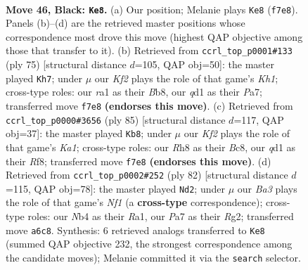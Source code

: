 \documentclass[11pt]{article}
\begin{document}
\clearpage

\begin{figure}[p]\centering
\begin{subfigure}{0.46\textwidth}\centering
\resizebox{\linewidth}{!}{%
\newchessgame
\chessboard[
  setfen={7r/p2r1k1p/bq1b2pP/1p1p1pP1/1n1P1P1K/1P2P3/4N3/R2Q1BNR b - - 39 46},
  showmover=false,
  pgfstyle=straightmove, color=movearrow, markmove={f7-e8}
]}
\caption{}
\end{subfigure}\hfill
\begin{subfigure}{0.46\textwidth}\centering
\resizebox{\linewidth}{!}{%
\newchessgame
\chessboard[
  setfen={1b1r3k/pb1q1p2/1p2pp1r/8/PP1PpN1P/4P1P1/3R1PN1/2RQ2K1 b - - 2 38},
  showmover=false,
  pgfstyle=straightmove, color=movearrow, markmove={h8-h7}
]}
\caption{}
\end{subfigure}
\\[4pt]
\begin{subfigure}{0.46\textwidth}\centering
\resizebox{\linewidth}{!}{%
\newchessgame
\chessboard[
  setfen={k1b2r1b/p2qpp2/3p4/P1pPP3/npP1QP1N/1N4R1/1P6/1KB5 b - - 26 43},
  showmover=false,
  pgfstyle=straightmove, color=movearrow, markmove={a8-b8}
]}
\caption{}
\end{subfigure}\hfill
\begin{subfigure}{0.46\textwidth}\centering
\resizebox{\linewidth}{!}{%
\newchessgame
\chessboard[
  setfen={2nq1r2/3b3r/kp2p2p/pn1p3P/2pP2P1/P1P1Q1BB/2P3R1/R4N1K w - - 5 42},
  showmover=false,
  pgfstyle=straightmove, color=movearrow, markmove={f1-d2}
]}
\caption{}
\end{subfigure}
\caption{\textbf{Move 46, Black: \texttt{Ke8}.} (a) Our position; Melanie plays \texttt{Ke8} (\texttt{f7e8}). Panels (b)--(d) are the retrieved master positions whose correspondence most drove this move (highest QAP objective among those that transfer to it). (b) Retrieved from \texttt{ccrl\_top\_p0001\#133} (ply 75) [structural distance $d$=105, QAP obj=50]: the master played \texttt{Kh7}; under $\mu$ our \emph{Kf2} plays the role of that game's \emph{Kh1}; cross-type roles: our \emph{r}a1 as their \emph{B}b8, our \emph{q}d1 as their \emph{P}a7; transferred move \texttt{f7e8} \textbf{(endorses this move)}. (c) Retrieved from \texttt{ccrl\_top\_p0000\#3656} (ply 85) [structural distance $d$=117, QAP obj=37]: the master played \texttt{Kb8}; under $\mu$ our \emph{Kf2} plays the role of that game's \emph{Ka1}; cross-type roles: our \emph{R}h8 as their \emph{B}c8, our \emph{q}d1 as their \emph{R}f8; transferred move \texttt{f7e8} \textbf{(endorses this move)}. (d) Retrieved from \texttt{ccrl\_top\_p0002\#252} (ply 82) [structural distance $d$=115, QAP obj=78]: the master played \texttt{Nd2}; under $\mu$ our \emph{Ba3} plays the role of that game's \emph{Nf1} (a \textbf{cross-type} correspondence); cross-type roles: our \emph{N}b4 as their \emph{R}a1, our \emph{P}a7 as their \emph{R}g2; transferred move \texttt{a6c8}. Synthesis: 6 retrieved analogs transferred to \texttt{Ke8} (summed QAP objective 232, the strongest correspondence among the candidate moves); Melanie committed it via the \texttt{search} selector.}
\label{fig:thought-m91}
\end{figure}
\end{document}
